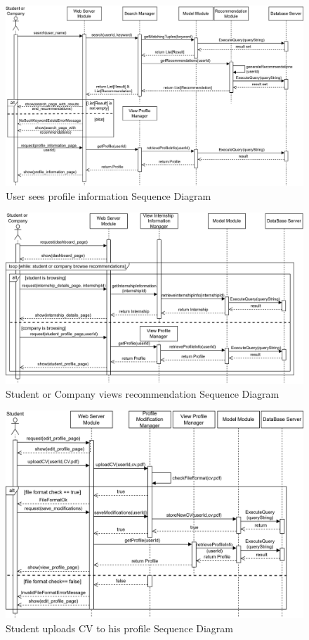 \begin{figure}[H]
    \centering
    \includegraphics[width=1\textwidth]{Images/Runtime_view/seeProfile_SD.png}
    \caption{User sees profile information Sequence Diagram}
\end{figure}
\begin{figure}[H]
    \centering
    \includegraphics[width=1\textwidth]{Images/Runtime_view/recommendation_SD.png}
    \caption{Student or Company views recommendation Sequence Diagram}
\end{figure}
\begin{figure}[H]
    \centering
    \includegraphics[width=1\textwidth]{Images/Runtime_view/uploadCV_SD.png}
    \caption{Student uploads CV to his profile Sequence Diagram}
\end{figure}
